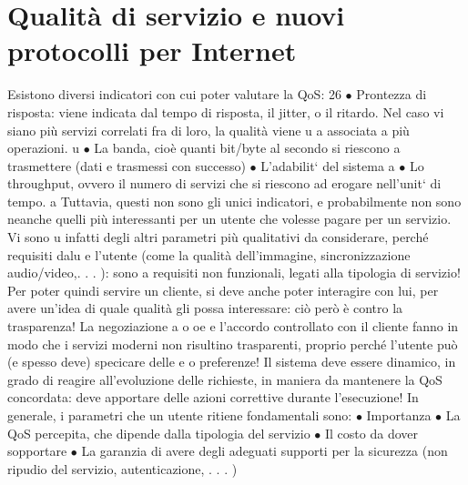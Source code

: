 
\section{Qualità di servizio e nuovi protocolli per Internet}
Esistono diversi indicatori con cui poter valutare la QoS:
26
$\bullet$ Prontezza di risposta: viene indicata dal tempo di risposta, il jitter, o il
ritardo. Nel caso vi siano più servizi correlati fra di loro, la qualità viene
u
a
associata a più operazioni.
u
$\bullet$ La banda, cioè quanti bit/byte al secondo si riescono a trasmettere (dati
e
trasmessi con successo)
$\bullet$ L'adabilit` del sistema
a
$\bullet$ Lo throughput, ovvero il numero di servizi che si riescono ad erogare
nell'unit` di tempo.
a
Tuttavia, questi non sono gli unici indicatori, e probabilmente non sono neanche
quelli più interessanti per un utente che volesse pagare per un servizio. Vi sono
u
infatti degli altri parametri più qualitativi da considerare, perché requisiti dalu
e
l'utente (come la qualità dell'immagine, sincronizzazione audio/video,. . . ): sono
a
requisiti non funzionali, legati alla tipologia di servizio! Per poter quindi servire
un cliente, si deve anche poter interagire con lui, per avere un'idea di quale
qualità gli possa interessare: ciò però è contro la trasparenza! La negoziazione
a
o
oe
e l'accordo controllato con il cliente fanno in modo che i servizi moderni non
risultino trasparenti, proprio perché l'utente può (e spesso deve) specicare delle
e
o
preferenze! Il sistema deve essere dinamico, in grado di reagire all'evoluzione
delle richieste, in maniera da mantenere la QoS concordata: deve apportare
delle azioni correttive durante l'esecuzione! In generale, i parametri che un
utente ritiene fondamentali sono:
$\bullet$ Importanza
$\bullet$ La QoS percepita, che dipende dalla tipologia del servizio
$\bullet$ Il costo da dover sopportare
$\bullet$ La garanzia di avere degli adeguati supporti per la sicurezza (non ripudio
del servizio, autenticazione, . . . )
